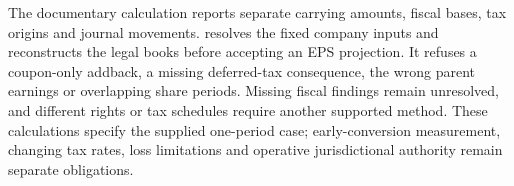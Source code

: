 The documentary  calculation reports separate
carrying amounts, fiscal bases, tax origins and journal movements.
 resolves the fixed company inputs and reconstructs the
legal books before accepting an EPS projection. It refuses a coupon-only
addback, a missing deferred-tax consequence, the wrong parent earnings or
overlapping share periods. Missing fiscal findings remain unresolved, and
different rights or tax schedules require another supported method. These
calculations specify the supplied one-period case; early-conversion measurement,
changing tax rates, loss limitations and operative jurisdictional authority
remain separate obligations.
